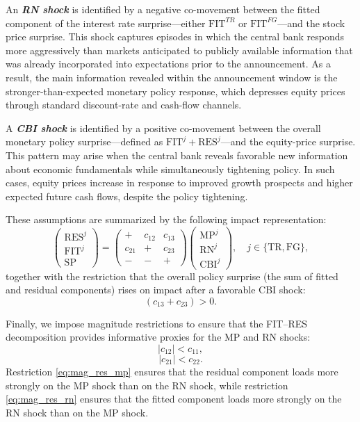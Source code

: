 \documentclass[\latexroot/\projectname]{subfiles}
\begin{document}
An \emph{\textbf{RN shock}} is identified by a negative co-movement between the fitted component of the interest rate surprise—either $\text{FIT}^{TR}$ or $\text{FIT}^{FG}$—and the stock price surprise. This shock captures episodes in which the central bank responds more aggressively than markets anticipated to publicly available information that was already incorporated into expectations prior to the announcement. As a result, the main information revealed within the announcement window is the stronger-than-expected monetary policy response, which depresses equity prices through standard discount-rate and cash-flow channels.

A \emph{\textbf{CBI shock}} is identified by a positive co-movement between the overall monetary policy surprise—defined as $\text{FIT}^{j}+\text{RES}^{j}$—and the equity-price surprise. This pattern may arise when the central bank reveals favorable new information about economic fundamentals while simultaneously tightening policy. In such cases, equity prices increase in response to improved growth prospects and higher expected future cash flows, despite the policy tightening.

These assumptions are summarized by the following impact representation:
\begin{equation}
\begin{pmatrix}
\text{RES}^{j} \\
\text{FIT}^{j} \\
\text{SP}
\end{pmatrix}
=
\begin{pmatrix}
+ & c_{12} & c_{13} \\
c_{21} & + & c_{23} \\
- & - & +
\end{pmatrix}
\begin{pmatrix}
\text{MP}^{j} \\
\text{RN}^{j} \\
\text{CBI}^{j}
\end{pmatrix},
\quad j \in \{\text{TR}, \text{FG}\},
\end{equation}
together with the restriction that the overall policy surprise (the sum of fitted and residual components) rises on impact after a favorable CBI shock:
\begin{equation}
\label{eq:cbi_policy_surprise}
(c_{13}+c_{23}) > 0.
\end{equation}

Finally, we impose magnitude restrictions to ensure that the FIT--RES decomposition provides informative proxies for the MP and RN shocks:
\begin{equation}
\label{eq:mag_res_mp}
|c_{12}| < c_{11},
\end{equation}
\begin{equation}
\label{eq:mag_res_rn}
|c_{21}| < c_{22}.
\end{equation}
Restriction \eqref{eq:mag_res_mp} ensures that the residual component loads more strongly on the MP shock than on the RN shock, while restriction \eqref{eq:mag_res_rn} ensures that the fitted component loads more strongly on the RN shock than on the MP shock. 
\end{document}
